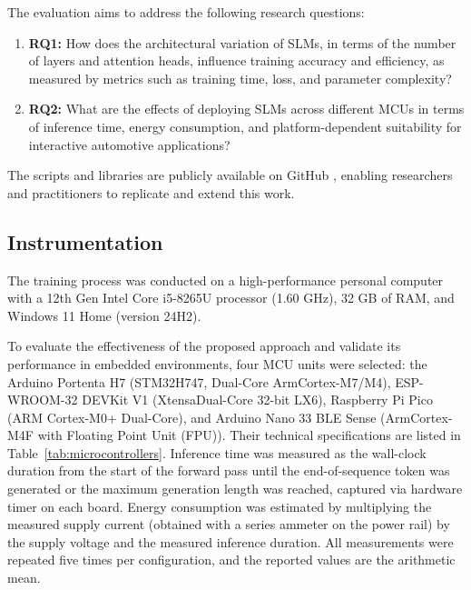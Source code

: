 \documentclass{ieeeaccess}
\begin{document}
The evaluation aims to address the following research questions:

\begin{enumerate}
\item \textbf{RQ1:} How does the architectural variation of SLMs, in terms of the number of layers and attention heads, influence training accuracy and efficiency, as measured by metrics such as training time, loss, and parameter complexity?

\item \textbf{RQ2:} What are the effects of deploying SLMs across different MCUs in terms of inference time, energy consumption, and platform-dependent suitability for interactive automotive applications?
\end{enumerate}

The scripts and libraries are publicly available on GitHub \cite{tinygpt}, enabling researchers and practitioners to replicate and extend this work.





\subsection{Instrumentation}

The training process was conducted on a high-performance personal computer with a 12th Gen Intel Core i5-8265U processor (1.60 GHz), 32 GB of RAM, and Windows 11 Home (version 24H2).

To evaluate the effectiveness of the proposed approach and validate its performance in embedded environments, four MCU units were selected: the Arduino Portenta H7 (STM32H747, Dual-Core Arm\textregistered  Cortex\textregistered-M7/M4), ESP-WROOM-32 DEVKit V1 (Xtensa\textregistered Dual-Core 32-bit LX6), Raspberry Pi Pico (ARM Cortex\textregistered-M0+ Dual-Core), and Arduino Nano 33 BLE Sense (Arm\textregistered Cortex\textregistered-M4F with Floating Point Unit (FPU)). Their technical specifications are listed in Table~\ref{tab:microcontrollers}. Inference time was measured as the wall-clock duration from the start of the forward pass until the end-of-sequence token was generated or the maximum generation length was reached, captured via hardware timer on each board. Energy consumption was estimated by multiplying the measured supply current (obtained with a series ammeter on the power rail) by the supply voltage and the measured inference duration. All measurements were repeated five times per configuration, and the reported values are the arithmetic mean.
\end{document}
